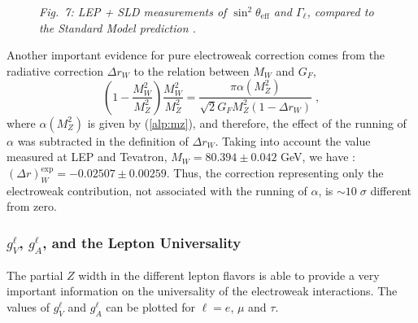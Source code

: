 \documentclass[12pt]{report}
\newcommand{\linha}{\enlargethispage{1\baselineskip}}
\def\text#1{{\scriptstyle\mathrm{#1}}}
\begin{document}
\begin{figure}[ht]
\protect
\epsfxsize=10cm
\begin{center}
\mbox{}
\end{center}
\begin{center}
\begin{minipage}[h]{12cm}
\begin{center}
{\it Fig.\ 7: LEP + SLD measurements of $\sin^2
\theta_{\text{eff}}$ and $\Gamma_\ell$, compared to the Standard
Model prediction \cite{LepSite}.}
\end{center}
\end{minipage}
\end{center}
\end{figure}

Another important evidence for pure electroweak correction comes from
the radiative correction ${\Delta r_W}$ to the relation between $M_W$
and $G_F$,
\begin{equation}
\left(1 - \frac{M_W^2}{M_Z^2} \right)  \frac{M_W^2}{M_Z^2} =
\frac{\pi \alpha(M_Z^2)}{\sqrt{2} G_F M_Z^2 (1- {\Delta r_W})} \; ,
\label{mw:gf}
\end{equation}         
where $\alpha(M_Z^2)$ is given by (\ref{alp:mz}), and therefore, the
effect of the running of $\alpha$ was subtracted in the definition of
${\Delta r_W}$. Taking into account the value measured at LEP and
Tevatron, $M_W = 80.394 \pm 0.042$ GeV, we have  \cite{Sirlin:99}:
${(\Delta r)}_W^{\text{exp}} =  - 0.02507 \pm 0.00259$.  Thus, the
correction representing only the electroweak contribution, not
associated with the running of $\alpha$, is $\sim 10 \; \sigma$
different from zero.

\linha


\subsubsection{$g_V^\ell$, $g_A^\ell$, and the Lepton Universality}  \indent

The partial $Z$ width in the different lepton flavors is able to
provide a very important information on the universality of the
electroweak interactions. The values of $g_V^\ell$ and
$g_A^\ell$ can be plotted for $\ell = e$, $\mu$ and $\tau$.
\end{document}
